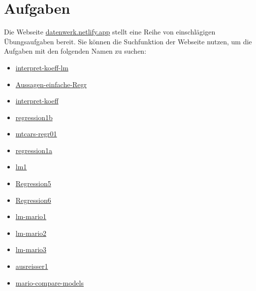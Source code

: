 \documentclass[
  letterpaper,
  oneside,
  open=any]{scrbook}
\providecommand{\tightlist}{%
  \setlength{\itemsep}{0pt}\setlength{\parskip}{0pt}}\usepackage{longtable,booktabs,array}
\theoremstyle{definition}
\theoremstyle{definition}
\theoremstyle{definition}
\theoremstyle{remark}
\begin{document}
\section{Aufgaben}\label{aufgaben-8}

Die Webseite \href{https://datenwerk.netlify.app}{datenwerk.netlify.app}
stellt eine Reihe von einschlägigen Übungsaufgaben bereit. Sie können
die Suchfunktion der Webseite nutzen, um die Aufgaben mit den folgenden
Namen zu suchen:

\begin{itemize}
\tightlist
\item
  \href{https://sebastiansauer.github.io/Datenwerk/posts/interpret-koeff-lm/interpret-koeff-lm.html}{interpret-koeff-lm}
\item
  \href{https://sebastiansauer.github.io/Datenwerk/posts/aussagen-einfache-regr/aussagen-einfache-regr}{Aussagen-einfache-Regr}
\item
  \href{https://sebastiansauer.github.io/Datenwerk/posts/interpret-koeff/interpret-koeff.html}{interpret-koeff}
\item
  \href{https://sebastiansauer.github.io/Datenwerk/posts/regression1b/regression1b.html}{regression1b}
\item
  \href{https://sebastiansauer.github.io/Datenwerk/posts/mtcars-regr01/mtcars-regr01.html}{mtcars-regr01}
\item
  \href{https://sebastiansauer.github.io/Datenwerk/posts/regression1a/regression1a.html}{regression1a}
\item
  \href{https://sebastiansauer.github.io/Datenwerk/posts/lm1/lm1.html}{lm1}
\item
  \href{https://sebastiansauer.github.io/Datenwerk/posts/regression5/regression5}{Regression5}
\item
  \href{https://sebastiansauer.github.io/Datenwerk/posts/regression6/regression6}{Regression6}
\item
  \href{https://sebastiansauer.github.io/Datenwerk/posts/lm-mario1/lm-mario1.html}{lm-mario1}
\item
  \href{https://sebastiansauer.github.io/Datenwerk/posts/lm-mario2/lm-mario2.html}{lm-mario2}
\item
  \href{https://sebastiansauer.github.io/Datenwerk/posts/lm-mario3/lm-mario3.html}{lm-mario3}
\item
  \href{https://sebastiansauer.github.io/Datenwerk/posts/ausreisser1/ausreisser1.html}{ausreisser1}
\item
  \href{https://sebastiansauer.github.io/Datenwerk/posts/mario-compare-models/}{mario-compare-models}
\end{itemize}
\end{document}
